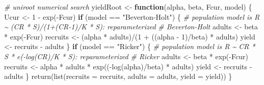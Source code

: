 \documentclass[
]{article}
\newenvironment{Shaded}{\begin{snugshade}}{\end{snugshade}}
\newcommand{\AttributeTok}[1]{\textcolor[rgb]{0.77,0.63,0.00}{#1}}
\newcommand{\CommentTok}[1]{\textcolor[rgb]{0.56,0.35,0.01}{\textit{#1}}}
\newcommand{\ControlFlowTok}[1]{\textcolor[rgb]{0.13,0.29,0.53}{\textbf{#1}}}
\newcommand{\DecValTok}[1]{\textcolor[rgb]{0.00,0.00,0.81}{#1}}
\newcommand{\FunctionTok}[1]{\textcolor[rgb]{0.00,0.00,0.00}{#1}}
\newcommand{\NormalTok}[1]{#1}
\newcommand{\OtherTok}[1]{\textcolor[rgb]{0.56,0.35,0.01}{#1}}
\newcommand{\SpecialCharTok}[1]{\textcolor[rgb]{0.00,0.00,0.00}{#1}}
\newcommand{\StringTok}[1]{\textcolor[rgb]{0.31,0.60,0.02}{#1}}
\begin{document}
\begin{Shaded}
\begin{Highlighting}[]
\CommentTok{\# uniroot numerical search}
\NormalTok{yieldRoot }\OtherTok{\textless{}{-}} \ControlFlowTok{function}\NormalTok{(alpha, beta, Fcur, model) \{}
\NormalTok{    Ucur }\OtherTok{\textless{}{-}} \DecValTok{1} \SpecialCharTok{{-}} \FunctionTok{exp}\NormalTok{(}\SpecialCharTok{{-}}\NormalTok{Fcur)}
    \ControlFlowTok{if}\NormalTok{ (model }\SpecialCharTok{==} \StringTok{"Beverton{-}Holt"}\NormalTok{) \{}
        \CommentTok{\# population model is R \textasciitilde{} (CR * S)/(1+(CR{-}1)/K * S): reparameterized}
        \CommentTok{\# Beverton{-}Holt}
\NormalTok{        adults }\OtherTok{\textless{}{-}}\NormalTok{ beta }\SpecialCharTok{*} \FunctionTok{exp}\NormalTok{(}\SpecialCharTok{{-}}\NormalTok{Fcur)}
\NormalTok{        recruits }\OtherTok{\textless{}{-}}\NormalTok{ (alpha }\SpecialCharTok{*}\NormalTok{ adults)}\SpecialCharTok{/}\NormalTok{(}\DecValTok{1} \SpecialCharTok{+}\NormalTok{ ((alpha }\SpecialCharTok{{-}} \DecValTok{1}\NormalTok{)}\SpecialCharTok{/}\NormalTok{beta) }\SpecialCharTok{*}\NormalTok{ adults)}
\NormalTok{        yield }\OtherTok{\textless{}{-}}\NormalTok{ recruits }\SpecialCharTok{{-}}\NormalTok{ adults}
\NormalTok{    \}}
    \ControlFlowTok{if}\NormalTok{ (model }\SpecialCharTok{==} \StringTok{"Ricker"}\NormalTok{) \{}
        \CommentTok{\# population model is R \textasciitilde{} CR * S * e({-}log(CR)/K * S): reparameterized}
        \CommentTok{\# Ricker}
\NormalTok{        adults }\OtherTok{\textless{}{-}}\NormalTok{ beta }\SpecialCharTok{*} \FunctionTok{exp}\NormalTok{(}\SpecialCharTok{{-}}\NormalTok{Fcur)}
\NormalTok{        recruits }\OtherTok{\textless{}{-}}\NormalTok{ alpha }\SpecialCharTok{*}\NormalTok{ adults }\SpecialCharTok{*} \FunctionTok{exp}\NormalTok{((}\SpecialCharTok{{-}}\FunctionTok{log}\NormalTok{(alpha)}\SpecialCharTok{/}\NormalTok{beta) }\SpecialCharTok{*}\NormalTok{ adults)}
\NormalTok{        yield }\OtherTok{\textless{}{-}}\NormalTok{ recruits }\SpecialCharTok{{-}}\NormalTok{ adults}
\NormalTok{    \}}
    \FunctionTok{return}\NormalTok{(}\FunctionTok{list}\NormalTok{(}\AttributeTok{recruits =}\NormalTok{ recruits, }\AttributeTok{adults =}\NormalTok{ adults, }\AttributeTok{yield =}\NormalTok{ yield))}
\NormalTok{\}}


\end{Highlighting}
\end{Shaded}
\end{document}
